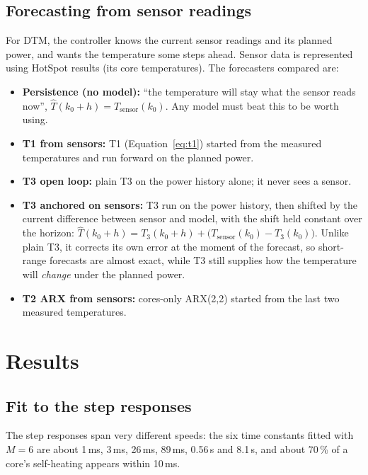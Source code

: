 \documentclass[11pt,a4paper]{article}
\begin{document}
\subsection{Forecasting from sensor readings}\label{sec:fcmodels}
For DTM, the controller knows the current sensor readings and its planned power, and wants the
temperature some steps ahead. Sensor data is represented using HotSpot results (its core
temperatures). The forecasters compared are:
\begin{itemize}
  \item \textbf{Persistence (no model):} ``the temperature will stay what the sensor reads now'',
        $\hat T(k_0 + h) = T_\text{sensor}(k_0)$. Any model must beat this to be worth using.
  \item \textbf{T1 from sensors:} T1 (Equation~\eqref{eq:t1}) started from the measured
        temperatures and run forward on the planned power.
  \item \textbf{T3 open loop:} plain T3 on the power history alone; it never sees a sensor.
  \item \textbf{T3 anchored on sensors:} T3 run on the power history, then shifted by the current
        difference between sensor and model, with the shift held constant over the horizon:
        $\hat T(k_0 + h) = T_3(k_0 + h) + \big(T_\text{sensor}(k_0) - T_3(k_0)\big)$.
        Unlike plain T3, it corrects its own error at the moment of the forecast, so short-range
        forecasts are almost exact, while T3 still supplies how the temperature will \emph{change}
        under the planned power.
  \item \textbf{T2 ARX from sensors:} cores-only ARX(2,2) started from the last two measured
        temperatures.
\end{itemize}

\section{Results}\label{sec:results}

\subsection{Fit to the step responses}
The step responses span very different speeds: the six time constants fitted with $M = 6$ are about
1\,ms, 3\,ms, 26\,ms, 89\,ms, 0.56\,s and 8.1\,s, and about 70\,\% of a core's self-heating appears
within 10\,ms.
\end{document}
